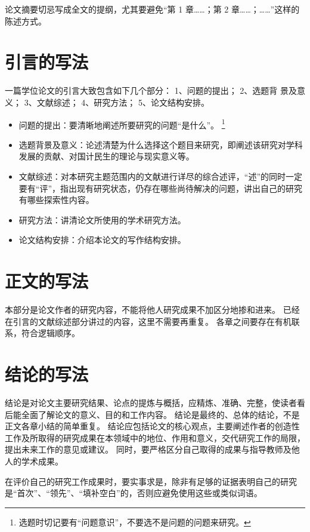 论文摘要切忌写成全文的提纲，尤其要避免“第 1 章……；第 2 章……；……”这样的陈述方式。



\section{引言的写法}

一篇学位论文的引言大致包含如下几个部分：
1、问题的提出；
2、选题背 景及意义；
3、文献综述；
4、研究方法；
5、论文结构安排。
\begin{itemize}
  \item 问题的提出：要清晰地阐述所要研究的问题“是什么”。
    \footnote{选题时切记要有“问题意识”，不要选不是问题的问题来研究。}
  \item 选题背景及意义：论述清楚为什么选择这个题目来研究，即阐述该研究对学科发展的贡献、对国计民生的理论与现实意义等。
  \item 文献综述：对本研究主题范围内的文献进行详尽的综合述评，“述”的同时一定要有“评”，指出现有研究状态，仍存在哪些尚待解决的问题，讲出自己的研究有哪些探索性内容。
  \item 研究方法：讲清论文所使用的学术研究方法。
  \item 论文结构安排：介绍本论文的写作结构安排。
\end{itemize}



\section{正文的写法}

本部分是论文作者的研究内容，不能将他人研究成果不加区分地掺和进来。
已经在引言的文献综述部分讲过的内容，这里不需要再重复。
各章之间要存在有机联系，符合逻辑顺序。



\section{结论的写法}

结论是对论文主要研究结果、论点的提炼与概括，应精炼、准确、完整，使读者看后能全面了解论文的意义、目的和工作内容。
结论是最终的、总体的结论，不是正文各章小结的简单重复。
结论应包括论文的核心观点，主要阐述作者的创造性工作及所取得的研究成果在本领域中的地位、作用和意义，交代研究工作的局限，提出未来工作的意见或建议。
同时，要严格区分自己取得的成果与指导教师及他人的学术成果。

在评价自己的研究工作成果时，要实事求是，除非有足够的证据表明自己的研究是“首次”、“领先”、“填补空白”的，否则应避免使用这些或类似词语。
